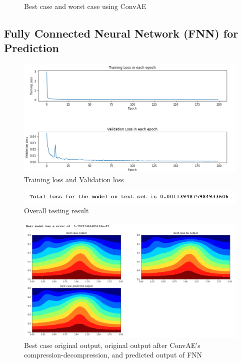 \begin{figure}[H]
\caption{Best case and worst case using ConvAE}
\label{fig:figures}
\end{figure}



\subsection{Fully Connected Neural Network (FNN) for Prediction}

\begin{figure}[H]
    \caption{Training loss and Validation loss}
    \includegraphics[scale=0.6]{Report LaTeX/figures/mantle_convection_images/larger_dataset/FNN_trainingData.png}
\end{figure}

\begin{figure}[H]
    \caption{Overall testing result}
    \includegraphics[scale=0.8]{Report LaTeX/figures/mantle_convection_images/larger_dataset/FNN_OverallTesting.png}
\end{figure}

\begin{figure}[H]
    \caption{Best case original output, original output after ConvAE's compression-decompression, and predicted output of FNN}
    \includegraphics[scale=0.5]{Report LaTeX/figures/mantle_convection_images/larger_dataset/FNN_Best.png}
\end{figure}

